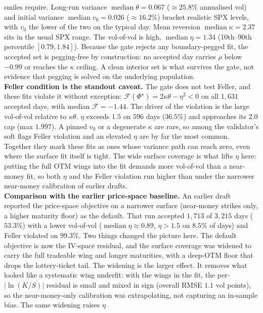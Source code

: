 \documentclass[a4paper, 11pt, reqno]{amsart}
\DeclareMathOperator{\med}{median}
\begin{document}
		smiles require. Long-run variance $\med\theta=0.067$ ($\approx 25.8\%$ annualised vol) and
		initial variance $\med v_0=0.026$ ($\approx 16.2\%$) bracket realistic SPX levels, with $v_0$
		the lower of the two on the typical day. Mean reversion $\med\kappa=2.37$ sits in the usual
		SPX range. The vol-of-vol is high, $\med\eta=1.34$ (10th--90th percentile $[0.79,1.84]$).
		Because the gate rejects any boundary-pegged fit, the accepted set is pegging-free by
		construction: no accepted day carries $\rho$ below $-0.99$ or reaches the $\kappa$ ceiling.
		A clean interior set is what survives the gate, not evidence that pegging is solved on the
		underlying population.
		\\ 
		\textbf{Feller condition is the standout caveat.} The gate does not test Feller, and these
		fits violate it without exception: $\mathcal{F}(\Phi^\star)=2\kappa\theta-\eta^2<0$ on all
		$1{,}631$ accepted days, with median $\mathcal{F}=-1.44$. The driver of the violation is the
		large vol-of-vol relative to $\kappa\theta$. $\eta$ exceeds $1.5$ on $596$ days ($36.5\%$) and
		approaches its $2.0$ cap (max $1.997$). A pinned $v_0$ or a degenerate $\kappa$ are rare, so
		among the validator's soft flags Feller violation and an elevated $\eta$ are by far the most
		common. Together they mark these fits as ones whose variance path can reach zero, even where
		the surface fit itself is tight. The wide surface coverage is what lifts $\eta$ here: putting
		the full OTM wings into the fit demands more vol-of-vol than a near-money fit, so both $\eta$
		and the Feller violation run higher than under the narrower near-money calibration of earlier
		drafts.
		\\ 
		\textbf{Comparison with the earlier price-space baseline.} An earlier draft reported the
		price-space objective on a narrower surface (near-money strikes only, a higher maturity floor)
		as the default. That run accepted $1{,}713$ of $3{,}215$ days ($53.3\%$) with a lower vol-of-vol
		($\med\eta\approx0.89$, $\eta>1.5$ on $8.5\%$ of days) and Feller violated on $99.3\%$. Two
		things changed the picture here. The default objective is now the IV-space residual, and the
		surface coverage was widened to carry the full tradeable wing and longer maturities, with a
		deep-OTM floor that drops the lottery-ticket tail. The widening is the larger effect. It removes
		what looked like a systematic wing underfit: with the wings in the fit, the per-$\lvert\ln(K/S)\rvert$
		residual is small and mixed in sign (overall RMSE $1.1$ vol points), so the near-money-only
		calibration was extrapolating, not capturing an in-sample bias. The same widening raises $\eta$
\end{document}
